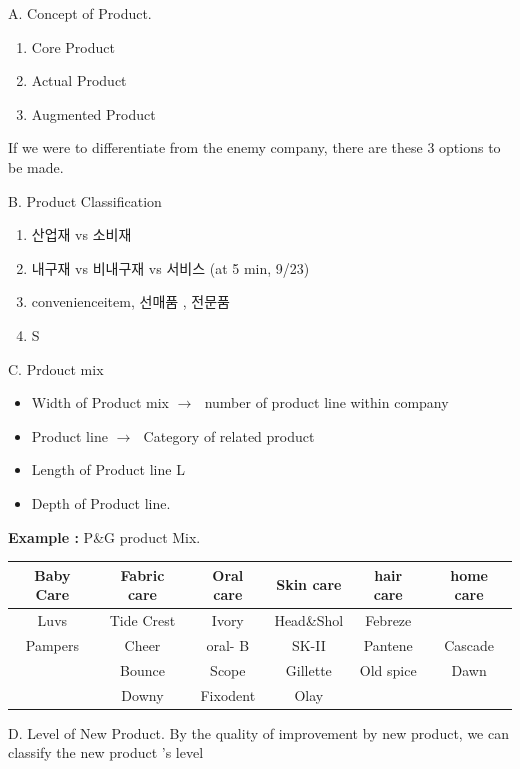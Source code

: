 \documentclass[12pt]{article}
\newcommand{\ra}{$\rightarrow \text{ }$}
\newcommand{\nii}{\noindent}
\begin{document}
A. Concept of Product.

\begin{enumerate}
	\item Core Product
	\item Actual Product
	\item Augmented Product
\end{enumerate}
If we were to differentiate from the enemy company, there are these 3 options to be made.

B. Product Classification

\begin{enumerate}
	\item 산업재 vs 소비재
	\item  내구재 vs 비내구재 vs 서비스 (at 5 min, 9/23)
	\item convenienceitem, 선매품 , 전문품
	\item  S
\end{enumerate}

C. Prdouct mix

\begin{itemize}
	\item Width of Product mix \ra number of product line within company
	\item Product line \ra Category of related product
	\item Length of Product line L
	\item Depth of Product line.
\end{itemize}
\nii
\textbf{Example :} P\&G product Mix.


\begin{tabular}{c|c|c|c|c|c}
	\hline
	Baby Care & Fabric care & Oral care & Skin care & hair care & home care \\
	\hline
	Luvs & Tide Crest & Ivory & Head\&Shol & Febreze \\
	Pampers & Cheer & oral- B & SK-II & Pantene & Cascade \\
	 & Bounce & Scope & Gillette & Old spice & Dawn \\
	 & Downy & Fixodent & Olay \\

\end{tabular}

D. Level of New Product.
By the quality of improvement by new product, we can classify the new product 's level
\end{document}
